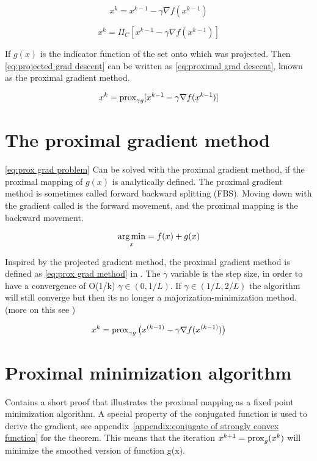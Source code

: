 		\begin{equation}
			x^k = x^{k-1} - \gamma \nabla f(x^{k-1})
			\label{eq:grad descent}
		\end{equation}
		
		\begin{equation}
			x^k = \Pi_C[ x^{k-1} - \gamma \nabla f(x^{k-1})]
			\label{eq:projected grad descent}
		\end{equation}
		
		If $g(x)$ is the indicator function of the set onto which was projected. Then  \eqref{eq:projected grad descent} can be written as \eqref{eq:proximal grad descent}, known as the proximal gradient method.
		
		\begin{equation}
				x^k = \operatorname{prox}_{\gamma g}[ x^{k-1} - \gamma \nabla f(x^{k-1})]
			\label{eq:proximal grad descent}
		\end{equation}
	
	\section{The proximal gradient method}
		\eqref{eq:prox grad problem} Can be solved with the proximal gradient method, if the proximal mapping of $g(x)$ is analytically defined.  The proximal gradient method is sometimes called forward backward splitting (FBS). Moving down with the gradient called is the forward movement, and the proximal mapping is the backward movement.
		
			\begin{equation}
			\underset{x}{\operatorname*{arg\,min}} = f(x) + g(x)
			\label{eq:prox grad problem}
			\end{equation}
		
		Inspired by the projected gradient method, the proximal gradient method is defined as \eqref{eq:prox grad method} in \cite{NealParikh}. The $\gamma$ variable is the step size, in order to have a convergence of O(1/k) $\gamma \in(0,1/L)$. If $\gamma \in (1/L,2/L)$ the algorithm will still converge but then its no longer a majorization-minimization method. (more on this see \cite{NealParikh})
		
		\begin{equation}
			x^k = \operatorname{prox}_{\gamma g}\big( x^{(k-1)}- \gamma \nabla f(x^{(k-1)})\big)
			\label{eq:prox grad method}
		\end{equation}	
	
	\section{Proximal minimization algorithm}
		 \cite{QianYang} Contains a short proof that illustrates the proximal mapping as a fixed point minimization algorithm. A special property of the conjugated function is used to derive the gradient, see appendix~\ref{appendix:conjugate of strongly convex function} for the theorem. This means that the iteration $x^{k+1}=\operatorname{prox}_g(x^k)$ will minimize the smoothed version of function g(x). 
		 

